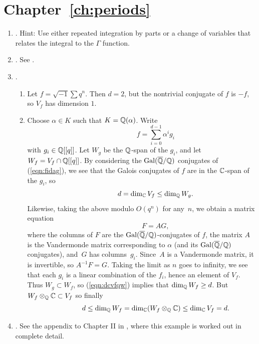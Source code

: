 \section{Chapter~\ref{ch:periods}}
\begin{enumerate}
\item {}. Hint: Use either repeated
integration by parts or a change of variables that relates the integral
to the $\Gamma$ function.

\item {}. See \cite[\S2.8]{cremona:algs}.


\item {}.
\begin{enumerate}
\item Let $f = \sqrt{-1} \sum q^n$.  Then $d=2$, but the nontrivial 
conjugate of $f$ is $-f$, so $V_f$ has dimension $1$.
\item Choose $\alpha \in K$ such that $K=\mathbb{Q}(\alpha)$.
 Write 
\begin{equation}\label{eqn:fidag}
\qquad\qquad f=\sum_{i=0}^{d-1} \alpha^i g_i
\end{equation}
with $g_i \in \mathbb{Q}[[q]]$.
Let $W_g$ be the $\mathbb{Q}$-span of the $g_i$, and let
$W_f = V_f \cap \mathbb{Q}[[q]]$. 
 By considering the $\operatorname{Gal}(\overline{\mathbb{Q}}/\mathbb{Q})$ conjugates of (\ref{eqn:fidag}),
we see that the Galois conjugates of $f$ are in the $\mathbb{C}$-span 
of the $g_i$, so
\begin{equation}\label{eqn:dcvfqw}
\qquad\qquad d = \dim_{\mathbb{C}} V_f \leq \dim_{\mathbb{Q}} W_g.
\end{equation}
Likewise, taking the above modulo $O(q^n)$ for any~$n$, 
we obtain a matrix equation 
$$
\qquad\qquad  F = A G,
$$
where the columns of $F$ are the $\operatorname{Gal}(\overline{\mathbb{Q}}/\mathbb{Q})$-conjugates of
$f$, the matrix $A$ is the Vandermonde matrix corresponding to
$\alpha$ (and its $\operatorname{Gal}(\overline{\mathbb{Q}}/\mathbb{Q})$ conjugates),  and~$G$ has
columns~$g_i$.  Since~$A$ is a Vandermonde matrix, it is 
invertible, so $A^{-1}F = G$.  Taking the limit as $n$ goes
to infinity, we see that each $g_i$ is a linear combination
of the $f_i$, hence an element of $V_f$.   
Thus $W_g \subset W_f$, so (\ref{eqn:dcvfqw})
implies that $\dim_{\mathbb{Q}} W_f \geq d$.  But $W_f \otimes_{\mathbb{Q}} \mathbb{C} \subset V_f$
so finally
$$
\qquad\qquad  d\leq \dim_{\mathbb{Q}} W_f = \dim_{\mathbb{C}} (W_f \otimes_{\mathbb{Q}} \mathbb{C}) \leq \dim_{\mathbb{C}} V_f = d.
$$

\end{enumerate}

\item {}. See the appendix to Chapter II in
  \cite{cremona:algs}, where this example is worked out in complete
  detail.  

\end{enumerate}

